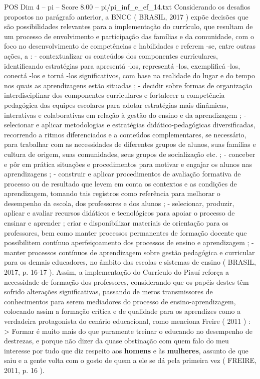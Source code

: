\begin{textsample}{POS Dim 4 – pi – Score 8.00 – pi/pi\_inf\_e\_ef\_14.txt}
Considerando os desafios propostos no parágrafo anterior, a BNCC ( BRASIL, 2017 ) expõe decisões que são possibilidades relevantes para a implementação do currículo, que resultam de um processo de envolvimento e participação das famílias e da comunidade, com o foco no desenvolvimento de competências e habilidades e referem -se, entre outras ações, a : - contextualizar os conteúdos dos componentes curriculares, identificando estratégias para apresentá -los, representá -los, exemplificá -los, conectá -los e torná -los significativos, com base na realidade do lugar e do tempo nos quais as aprendizagens estão situadas ; - decidir sobre formas de organização interdisciplinar dos componentes curriculares e fortalecer a competência pedagógica das equipes escolares para adotar estratégias mais dinâmicas, interativas e colaborativas em relação à gestão do ensino e da aprendizagem ; - selecionar e aplicar metodologias e estratégias didático-pedagógicas diversificadas, recorrendo a ritmos diferenciados e a conteúdos complementares, se necessário, para trabalhar com as necessidades de diferentes grupos de alunos, suas famílias e cultura de origem, suas comunidades, seus grupos de socialização etc. ; - conceber e pôr em prática situações e procedimentos para motivar e engajar os alunos nas aprendizagens ; - construir e aplicar procedimentos de avaliação formativa de processo ou de resultado que levem em conta os contextos e as condições de aprendizagem, tomando tais registros como referência para melhorar o desempenho da escola, dos professores e dos alunos ; - selecionar, produzir, aplicar e avaliar recursos didáticos e tecnológicos para apoiar o processo de ensinar e aprender ; criar e disponibilizar materiais de orientação para os professores, bem como manter processos permanentes de formação docente que possibilitem contínuo aperfeiçoamento dos processos de ensino e aprendizagem ; - manter processos contínuos de aprendizagem sobre gestão pedagógica e curricular para os demais educadores, no âmbito das escolas e sistemas de ensino ( BRASIL, 2017, p. 16-17 ).
Assim, a implementação do Currículo do Piauí reforça a necessidade de formação dos professores, considerando que os papéis destes têm sofrido alterações significativas, passando de meros transmissores de conhecimentos para serem mediadores do processo de ensino-aprendizagem, colocando assim a formação crítica e de qualidade para os aprendizes como a verdadeira protagonista do cenário educacional, como menciona Freire ( 2011 ) : > Formar é muito mais do que puramente treinar o educando no desempenho de destrezas, e porque não dizer da quase obstinação com quem falo do meu interesse por tudo que diz respeito aos \textbf{homens} e às \textbf{mulheres}, assunto de que saiu e a gente volta com o gosto de quem a ele se dá pela primeira vez ( FREIRE, 2011, p. 16 ).

\end{textsample}
